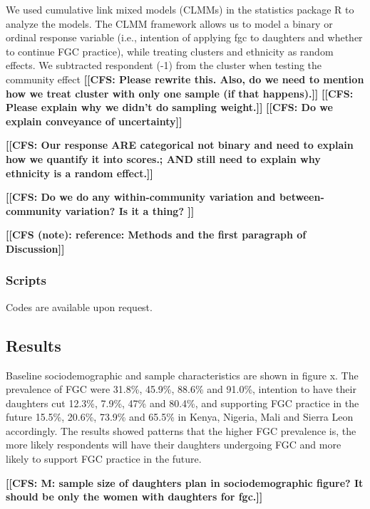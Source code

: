 \documentclass[12pt,]{article}
\newcommand{\comment}[1]{\textbf{[[#1]]}}
\newcommand{\cfcmt}[1]{\comment{CFS: #1}}
\newcommand{\cfonly}[1]{\comment{CFS (note): #1}}
\begin{document}
We used cumulative link mixed models (CLMMs) in the statistics package R \cite{Rstats,Rpackage_ordinal} to analyze the models.  The CLMM framework allows us to model a binary or ordinal response variable (i.e., intention of applying fgc to daughters and whether to continue FGC practice), while treating clusters and ethnicity as random effects.  
We subtracted respondent (-1) from the cluster when testing the community effect \cfcmt{Please rewrite this. Also, do we need to mention how we treat cluster with only one sample (if that happens).}
\cfcmt{Please explain why we didn’t do sampling weight.}
\cfcmt{Do we explain conveyance of uncertainty}

\cfcmt{Our response ARE categorical not binary and need to explain how we quantify it into scores.; AND still need to explain why ethnicity is a random effect.}

\cfcmt{Do we do any within-community variation and between-community variation?  Is it a thing?
}

\cfonly{reference: Methods and the first paragraph of Discussion\cite{Chia14}}


\subsubsection{Scripts}\label{scripts}

Codes are available upon request. 

\subsection{Results}\label{results-1}

Baseline sociodemographic and sample characteristics are shown in figure x.  The prevalence of FGC were 31.8\%, 45.9\%, 88.6\% and 91.0\%, intention to have their daughters cut 12.3\%, 7.9\%, 47\% and 80.4\%, and supporting FGC practice in the future 15.5\%, 20.6\%, 73.9\% and 65.5\% in Kenya, Nigeria, Mali and Sierra Leon accordingly.  The results showed patterns that the higher FGC prevalence is, the more likely respondents will have their daughters undergoing FGC and more likely to support FGC practice in the future.  

\cfcmt{M: sample size of daughters plan in sociodemographic figure?  It should be only the women with daughters for fgc.}
\end{document}

